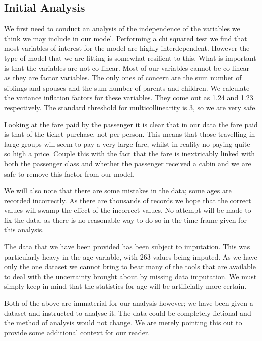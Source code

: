 \documentclass[]{extarticle}
\begin{document}
\subsection{Initial Analysis}

We first need to conduct an analysis of the independence of the variables we think we may include in our model. Performing a chi squared test we find that most variables of interest for the model are highly interdependent. However the type of model that we are fitting is somewhat resilient to this. What is important is that the variables are not co-linear. Most of our variables cannot be co-linear as they are factor variables. The only ones of concern are the sum number of siblings and spouses and the sum number of parents and children. We calculate the variance inflation factors for these variables. They come out as 1.24 and 1.23 respectively. The standard threshold for multicollinearity is 3, so we are very safe.

Looking at the fare paid by the passenger it is clear that in our data the fare paid is that of the ticket purchase, not per person. This means that those travelling in large groups will seem to pay a very large fare, whilst in reality no paying quite so high a price. Couple this with the fact that the fare is inextricably linked with both the passenger class and whether the passenger received a cabin and we are safe to remove this factor from our model. 

We will also note that there are some mistakes in the data; some ages are recorded incorrectly. As there are thousands of records we hope that the correct values will swamp the effect of the incorrect values. No attempt will be made to fix the data, as there is no reasonable way to do so in the time-frame given for this analysis.

The data that we have been provided has been subject to imputation. This was particularly heavy in the age variable, with 263 values being imputed. As we have only the one dataset we cannot bring to bear many of the tools that are available to deal with the uncertainty brought about by missing data imputation. We must simply keep in mind that the statistics for age will be artificially more certain.

Both of the above are immaterial for our analysis however; we have been given a dataset and instructed to analyse it. The data could be completely fictional and the method of analysis would not change. We are merely pointing this out to provide some additional context for our reader.
\end{document}
